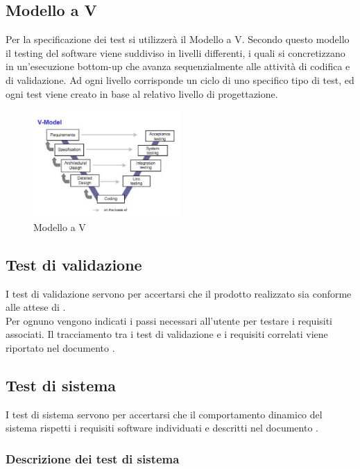 	\subsection{Modello a V}
	\label{modelloAV}
			Per la specificazione dei test si utilizzerà il Modello a V. Secondo questo modello il testing del software viene suddiviso in livelli differenti, i quali si concretizzano in un'esecuzione bottom-up che avanza sequenzialmente alle attività di codifica e di validazione. Ad ogni livello corrisponde un ciclo di uno specifico tipo di test, ed ogni test viene creato in base al relativo livello di progettazione.
			\begin{figure}[htp]
				\centering
				\includegraphics[width=0.5\textwidth]{img/V-model.jpg}
				\caption{Modello a V}
			\end{figure}
	\subsection{Test di validazione}
	\label{testDiValidazione}

I test di validazione servono per accertarsi che il prodotto realizzato sia conforme alle attese di \PROPONENTE. \\
Per ognuno vengono indicati i passi necessari all'utente per testare i requisiti associati. Il tracciamento tra i test di validazione e i requisiti correlati viene riportato nel documento \ARdoc.

		
	\subsection{Test di sistema}
	\label{testDiSistema}
		I test di sistema servono per accertarsi che il comportamento dinamico del sistema rispetti i requisiti software individuati e descritti nel documento \ARdoc.
		\subsubsection{Descrizione dei test di sistema}
			
			
